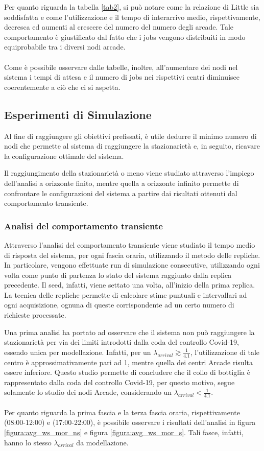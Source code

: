 \documentclass{article}
\begin{document}
Per quanto riguarda la tabella \ref{tab2}, si può notare come la relazione di Little sia soddisfatta e come l'utilizzazione e il tempo di interarrivo medio, rispettivamente, decresca ed aumenti al crescere del numero del numero degli arcade. Tale comportamento è giustificato dal fatto che i jobs vengono distribuiti in modo equiprobabile tra i diversi nodi arcade.
\\ \\
Come è possibile osservare dalle tabelle, inoltre, all'aumentare dei nodi nel sistema i tempi di attesa e il numero di jobs nei rispettivi centri diminuisce coerentemente a ciò che ci si aspetta.

\subsection{Esperimenti di Simulazione}
Al fine di raggiungere gli obiettivi prefissati, è utile dedurre il minimo numero di nodi che permette al sistema di raggiungere la stazionarietà e, in seguito, ricavare la configurazione ottimale del sistema.

Il raggiungimento della stazionarietà o meno viene studiato attraverso l'impiego dell'analisi a orizzonte finito, mentre quella a orizzonte infinito permette di confrontare le configurazioni del sistema a partire dai risultati ottenuti dal comportamento transiente.
\subsubsection{Analisi del comportamento transiente}
Attraverso l'analisi del comportamento transiente viene studiato il tempo medio di risposta del sistema, per ogni fascia oraria, utilizzando il metodo delle repliche.
In particolare, vengono effettuate run di simulazione
consecutive, utilizzando ogni volta come punto di partenza lo stato del sistema raggiunto dalla replica precedente. Il seed, infatti, viene settato una volta, all'inizio della prima replica.
La tecnica delle repliche permette di calcolare stime puntuali e intervallari ad ogni acquisizione, ognuna di queste corrispondente ad un certo numero di richieste processate.

Una prima analisi ha portato ad osservare che il sistema non può raggiungere la stazionarietà per via dei limiti introdotti dalla coda del controllo Covid-19, essendo unica per modellazione. Infatti, per un $\lambda_{arrival} \gtrsim \frac{1}{4.1}$, l'utilizzazione di tale centro è approssimativamente pari ad 1, mentre quella dei centri Arcade risulta essere inferiore. Questo studio permette di concludere che il collo di bottiglia è rappresentato dalla coda del controllo Covid-19, per questo motivo, segue solamente lo studio dei nodi Arcade, considerando un $\lambda_{arrival} < \frac{1}{4.1}$.
\\ \\
Per quanto riguarda la prima fascia e la terza fascia oraria, rispettivamente (08:00-12:00) e (17:00-22:00), è possibile osservare i risultati dell'analisi in figura \ref{figura:avg_ws_mor_ns} e figura \ref{figura:avg_ws_mor_s}. Tali fasce, infatti, hanno lo stesso $\lambda_{arrival}$ da modellazione.
\end{document}
